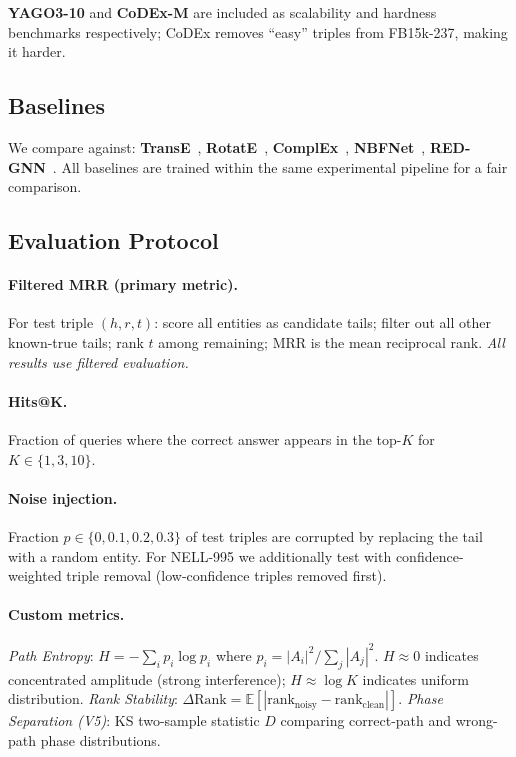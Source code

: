 \documentclass[runningheads]{llncs}
\begin{document}
\textbf{YAGO3-10} and \textbf{CoDEx-M} are included as scalability and
hardness benchmarks respectively; CoDEx removes ``easy'' triples from
FB15k-237, making it harder.

\subsection{Baselines}

We compare against: \textbf{TransE}~\cite{ref_transe},
\textbf{RotatE}~\cite{ref_rotate}, \textbf{ComplEx}~\cite{ref_complex},
\textbf{NBFNet}~\cite{ref_nbfnet}, \textbf{RED-GNN}~\cite{ref_redgnn}.
All baselines are trained within the same experimental pipeline for a fair
comparison.

\subsection{Evaluation Protocol}

\paragraph{Filtered MRR (primary metric).}
For test triple $(h,r,t)$: score all entities as candidate tails; filter
out all other known-true tails; rank $t$ among remaining; MRR is the mean
reciprocal rank.  \emph{All results use filtered evaluation.}

\paragraph{Hits@K.}
Fraction of queries where the correct answer appears in the top-$K$ for
$K\in\{1,3,10\}$.

\paragraph{Noise injection.}
Fraction $p\in\{0,0.1,0.2,0.3\}$ of test triples are corrupted by replacing
the tail with a random entity.  For NELL-995 we additionally test with
confidence-weighted triple removal (low-confidence triples removed first).

\paragraph{Custom metrics.}
\textit{Path Entropy}: $H=-\sum_i p_i\log p_i$ where
$p_i=|A_i|^2/\sum_j|A_j|^2$.  $H\approx 0$ indicates concentrated amplitude
(strong interference); $H\approx\log K$ indicates uniform distribution.
\textit{Rank Stability}: $\Delta\mathrm{Rank}=\mathbb{E}[|\text{rank}_\text{noisy}-\text{rank}_\text{clean}|]$.
\textit{Phase Separation (V5)}: KS two-sample statistic $D$ comparing
correct-path and wrong-path phase distributions.
\end{document}
